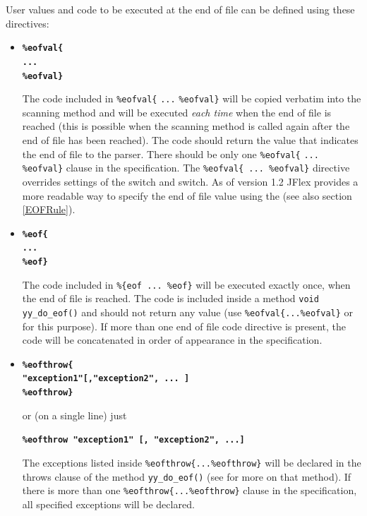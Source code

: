 \documentclass[11pt]{scrartcl}
\newcommand{\trit}{\em}
\begin{document}
User values and code to be executed at the end of file can be defined using these directives:
\begin{itemize}
\label{eofval}
\item
{\bf \verb+%eofval{+}\\
{\bf \texttt{...}}\\
{\bf \verb+%eofval}+}

The code included in \verb+%eofval{+ \texttt{...} \verb+%eofval}+ will
be copied verbatim into the scanning method and will be executed {\trit each time} 
when the end of file is reached (this is possible when
the scanning method is called again after the end of file has been
reached). The code should return the value that indicates the end of
file to the parser.  There should be only one \verb+%eofval{+ 
\texttt{...} \verb+%eofval}+ clause in the specification.  
The \verb+%eofval{ ... %eofval}+ directive overrides settings of the 
\texttt{} switch and \texttt{} switch. 
As of version 1.2 JFlex provides
a more readable way to specify the end of file value using the
 (see also section \ref{EOFRule}).

\item\label{eof}
  {\bf \verb+%eof{+}\\
  {\bf \texttt{...}}\\
  {\bf \verb+%eof}+} 
  
  The code included in \verb+%{eof ... %eof}+ will be executed
  exactly once, when the end of file is reached. The code is included
  inside a method \texttt{void yy\_do\_eof()} and should not return any
  value (use \verb+%eofval{...%eofval}+ or 
   for this purpose). If more than one 
  end of file code directive is present, the code will be concatenated
  in order of appearance in the specification.
 

\item
  {\bf \verb+%eofthrow{+}\\
  {\bf \texttt{"exception1"[,"exception2", ... ]}}\\
  {\bf \verb+%eofthrow}+}

  or (on a single line) just

  {\bf \texttt{\%eofthrow "exception1" [,  "exception2", ...]}}
  
  The exceptions listed inside \verb+%eofthrow{...%eofthrow}+ will
  be declared in the throws clause of the method \texttt{yy\_do\_eof()}
  (see  for more on that method).
  If there is more than one \verb+%eofthrow{...%eofthrow}+ clause
  in the specification, all specified exceptions will be declared.
 


\end{itemize}
\end{document}
